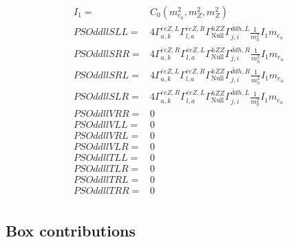 \documentclass[A4,landscape]{article}
\begin{document}
\begin{align} 
I_1= & C_0(m^2_{e_{{a}}}, m^2_{Z}, m^2_{Z}) \\ 
  PSOddllSLL= & 4  \Gamma^{\bar{e}e Z ,L}_{a, k} \Gamma^{\bar{e}e Z ,R}_{l, a} \Gamma^{h Z Z }_\text{Null} \Gamma^{\bar{d}d h ,L}_{j, i} \frac{1}{m^2_{h}} I_1 m_{e_{{a}}} \\ 
  PSOddllSRR= & 4  \Gamma^{\bar{e}e Z ,R}_{a, k} \Gamma^{\bar{e}e Z ,L}_{l, a} \Gamma^{h Z Z }_\text{Null} \Gamma^{\bar{d}d h ,R}_{j, i} \frac{1}{m^2_{h}} I_1 m_{e_{{a}}} \\ 
  PSOddllSRL= & 4  \Gamma^{\bar{e}e Z ,L}_{a, k} \Gamma^{\bar{e}e Z ,R}_{l, a} \Gamma^{h Z Z }_\text{Null} \Gamma^{\bar{d}d h ,R}_{j, i} \frac{1}{m^2_{h}} I_1 m_{e_{{a}}} \\ 
  PSOddllSLR= & 4  \Gamma^{\bar{e}e Z ,R}_{a, k} \Gamma^{\bar{e}e Z ,L}_{l, a} \Gamma^{h Z Z }_\text{Null} \Gamma^{\bar{d}d h ,L}_{j, i} \frac{1}{m^2_{h}} I_1 m_{e_{{a}}} \\ 
  PSOddllVRR= & 0 \\ 
  PSOddllVLL= & 0 \\ 
  PSOddllVRL= & 0 \\ 
  PSOddllVLR= & 0 \\ 
  PSOddllTLL= & 0 \\ 
  PSOddllTLR= & 0 \\ 
  PSOddllTRL= & 0 \\ 
  PSOddllTRR= & 0 \\ 
\end{align} 
\subsection{Box contributions} 
\end{document}
